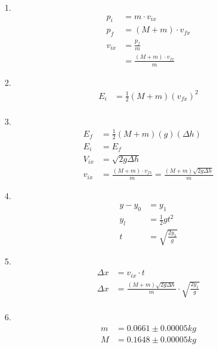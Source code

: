     \begin{enumerate}
        \item [1.]
        \begin{align*}
            p_{i}   & = m \cdot v_{ix}      \\
            p_{f}   & = (M+m) \cdot v_{fx}  \\
            v_{ix}  & = \frac{p_{f}}{m}     \\
                    & = \boxed{\frac{(M+m) \cdot v_{fx}}{m}}
        \end{align*}

        \item [2.]
        \begin{align*}
            E_{i}   & = \frac{1}{2}(M+m)(v_{fx})^{2}    \\ 
        \end{align*}

        \item [3.]
        \begin{align*}
            E_{f}   & = \frac{1}{2}(M+m)(g)(\Delta h)   \\
            E_{i}   & = E_{f}                           \\
            V_{ix}  & = \sqrt{2g\Delta h}               \\
            v_{ix}  & = \frac{(M+m) \cdot v_{fx}}{m}    
                      = \boxed{\frac{(M+m)\sqrt{2g\Delta h}}{m}}
        \end{align*}

        \item [4.]
        \begin{align*}
            y - y_{0}   & = y_{1}                       \\
            y_{l}       & = \frac{1}{2}gt^{2}           \\
            t           & = \boxed{\sqrt{\frac{2y_{1}}{g}}}
        \end{align*}

        \item [5.]
        \begin{align*}
            \Delta x    & = v_{ix} \cdot t                  \\
            \Delta x    & = \frac{(M+m)\sqrt{2g\Delta h}}{m} \cdot 
                            \boxed{\sqrt{\frac{2y_{1}}{g}}} \\
        \end{align*}

        \item [6.]
        \begin{align*}
            m   & = 0.0661 \pm 0.00005 kg                   \\
            M   & = 0.1648 \pm 0.00005 kg                   \\  
        \end{align*}


\end{enumerate}
